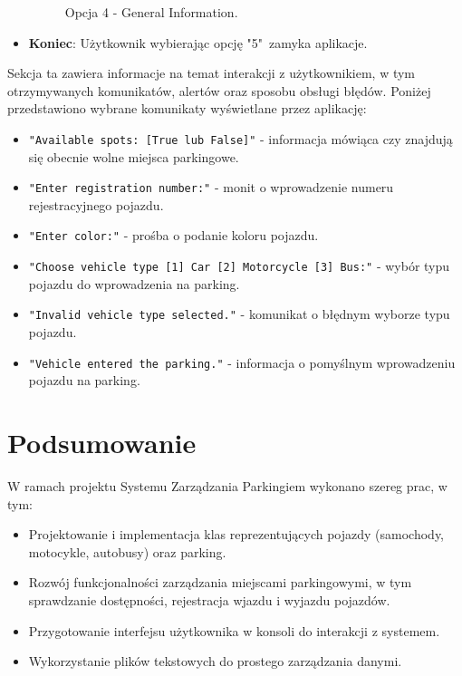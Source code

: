 \documentclass{article}
\begin{document}
\begin{itemize}
\begin{figure}[H]
        \caption{Opcja 4 - General Information.}
        \end{figure} 
\item \textbf{Koniec}:
    Użytkownik wybierając opcję "5"\ zamyka aplikacje.
\end{itemize}

Sekcja ta zawiera informacje na temat interakcji z użytkownikiem, w tym otrzymywanych komunikatów, alertów oraz sposobu obsługi błędów. Poniżej przedstawiono wybrane komunikaty wyświetlane przez aplikację:

\begin{itemize}
    \item \texttt{"Available spots: [True lub False]"} - informacja mówiąca czy znajdują się obecnie wolne miejsca parkingowe.
    \item \texttt{"Enter registration number:"} - monit o wprowadzenie numeru rejestracyjnego pojazdu.
    \item \texttt{"Enter color:"} - prośba o podanie koloru pojazdu.
    \item \texttt{"Choose vehicle type [1] Car [2] Motorcycle [3] Bus:"} - wybór typu pojazdu do wprowadzenia na parking.
    \item \texttt{"Invalid vehicle type selected."} - komunikat o błędnym wyborze typu pojazdu.
    \item \texttt{"Vehicle entered the parking."} - informacja o pomyślnym wprowadzeniu pojazdu na parking.
\end{itemize}

\section{Podsumowanie}

W ramach projektu Systemu Zarządzania Parkingiem wykonano szereg prac, w tym:
\begin{itemize}
    \item Projektowanie i implementacja klas reprezentujących pojazdy (samochody, motocykle, autobusy) oraz parking.
    \item Rozwój funkcjonalności zarządzania miejscami parkingowymi, w tym sprawdzanie dostępności, rejestracja wjazdu i wyjazdu pojazdów.
    \item Przygotowanie interfejsu użytkownika w konsoli do interakcji z systemem.
    \item Wykorzystanie plików tekstowych do prostego zarządzania danymi.
\end{itemize}
\end{document}
